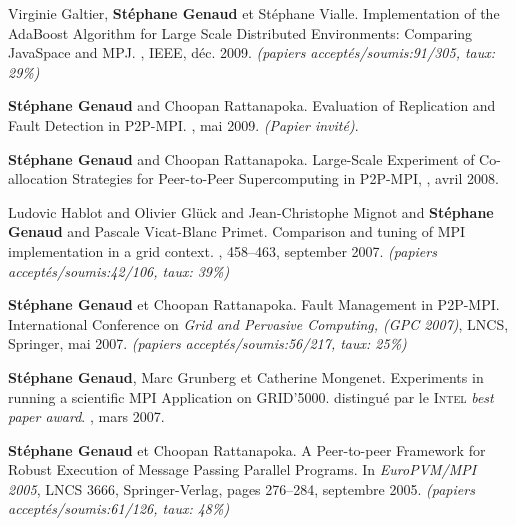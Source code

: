 \documentclass[11pt]{article}
\newcommand{\pmpi}{\mbox{\textsc{P2P-MPI}}}
\begin{document}
\begin{thebibliography}{99}
\newblock Virginie Galtier, \textbf{Stéphane Genaud} et Stéphane Vialle.
\newblock Implementation of the AdaBoost Algorithm for Large Scale Distributed Environments:%
Comparing JavaSpace and MPJ.
, IEEE, déc. 2009.
\newblock \small{\textit{(papiers acceptés/soumis:91/305, taux: 29\%)}}


\textbf{Stéphane Genaud} and Choopan Rattanapoka.
\newblock Evaluation of Replication and Fault Detection in P2P-MPI.
, mai 2009.
\newblock \textit{(Papier invité)}.

\textbf{Stéphane Genaud} and Choopan Rattanapoka. 
\newblock Large-Scale Experiment of Co-allocation Strategies for Peer-to-Peer Supercomputing in P2P-MPI,
, avril 2008.

Ludovic Hablot and Olivier Glück and Jean-Christophe Mignot and \textbf{Stéphane Genaud} and Pascale Vicat-Blanc Primet.
\newblock Comparison and tuning of MPI implementation in a grid context.
, 458--463, september 2007.
\newblock \small{\textit{(papiers acceptés/soumis:42/106, taux: 39\%)}}

\newblock \textbf{Stéphane Genaud} et Choopan Rattanapoka.
\newblock Fault Management in {\pmpi}. 
\newblock International Conference on {\em Grid and Pervasive Computing, (GPC 2007)}, LNCS, Springer, mai 2007.
\newblock \small{\textit{(papiers acceptés/soumis:56/217, taux: 25\%)}}

\newblock \textbf{Stéphane Genaud}, Marc Grunberg et Catherine Mongenet.
\newblock Experiments in running a scientific {MPI} Application on GRID'5000. 
\newblock distingué par le \textsc{Intel} \textit{best paper award}.
, mars 2007.


\textbf{Stéphane Genaud} et Choopan Rattanapoka.
\newblock A Peer-to-peer Framework for Robust Execution of Message Passing Parallel Programs.
\newblock In {\em EuroPVM/MPI 2005}, LNCS 3666, Springer-Verlag, pages 276--284, septembre 2005.
\newblock \small{\textit{(papiers acceptés/soumis:61/126, taux: 48\%)}}



\end{thebibliography}
\end{document}
